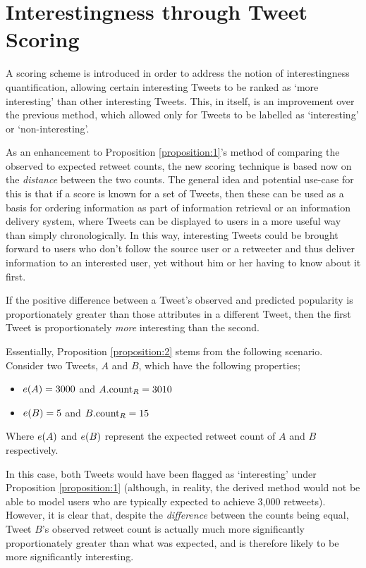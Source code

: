 \section{Interestingness through Tweet Scoring}
A scoring scheme is introduced in order to address the notion of interestingness quantification, allowing certain interesting Tweets to be ranked as `more interesting' than other interesting Tweets. This, in itself, is an improvement over the previous method, which allowed only for Tweets to be labelled as `interesting' or `non-interesting'.

As an enhancement to Proposition \ref{proposition:1}'s method of comparing the observed to expected retweet counts, the new scoring technique is based now on the \textit{distance} between the two counts. The general idea and potential use-case for this is that if a score is known for a set of Tweets, then these can be used as a basis for ordering information as part of information retrieval or an information delivery system, where Tweets can be displayed to users in a more useful way than simply chronologically. In this way, interesting Tweets could be brought forward to users who don't follow the source user or a retweeter and thus deliver information to an interested user, yet without him or her having to know about it first.

\begin{myproposition}
\label{proposition:2}
If the positive difference between a Tweet's observed and predicted popularity is proportionately greater than those attributes in a different Tweet, then the first Tweet is proportionately \textit{more} interesting than the second.
\end{myproposition}

Essentially, Proposition \ref{proposition:2} stems from the following scenario. Consider two Tweets, $A$ and $B$, which have the following properties;
\begin{itemize}
    \item $e(A) = 3000$ and $A.\textrm{count}_R = 3010$
    \item $e(B) = 5$ and $B.\textrm{count}_R = 15$
\end{itemize}
Where $e(A)$ and $e(B)$ represent the expected retweet count of $A$ and $B$ respectively.

In this case, both Tweets would have been flagged as `interesting' under Proposition \ref{proposition:1} (although, in reality, the derived method would not be able to model users who are typically expected to achieve 3,000 retweets). However, it is clear that, despite the \textit{difference} between the counts being equal, Tweet $B$'s observed retweet count is actually much more significantly proportionately greater than what was expected, and is therefore likely to be more significantly interesting.


